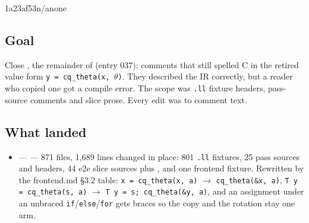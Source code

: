 %
  {1a23af53}{n/a}{none}

\subsection*{Goal}
Close , the remainder of 
(entry 037): comments that still spelled C in the retired value form
\texttt{y = cq\_theta(x, $\theta$)}. They described the IR correctly, but a reader who
copied one got a compile error. The scope was \texttt{.ll} fixture headers, pass-source
comments and slice prose. Every edit was to comment text.

\subsection*{What landed}
\begin{itemize}
  \item {} ---  --- 871 files, 1,689 lines
  changed in place: 801 \texttt{.ll} fixtures, 25 pass sources and headers, 44 e2e slice
  sources plus , and one frontend fixture. Rewritten by the
  frontend.md \S3.2 table: \texttt{x = cq\_theta(x, a)} $\to$ \texttt{cq\_theta(\&x, a)},
  \texttt{T y = cq\_theta(s, a)} $\to$ \texttt{T y = s; cq\_theta(\&y, a)}, and an
  assignment under an unbraced \texttt{if}/\texttt{else}/\texttt{for} gets braces so the
  copy and the rotation stay one arm.
\end{itemize}

